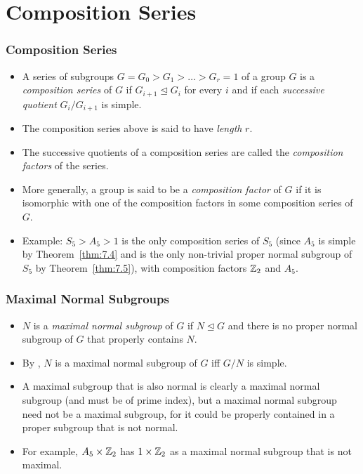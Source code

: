 \documentclass[../Odyssey_Project.tex]{subfiles}
\begin{document}
\setcounter{section}{9}
\section{Composition Series}

\subsubsection*{Composition Series}
\begin{itemize}
  \item A series of subgroups $G = G_0 > G_1 > \ldots > G_r = 1$ of a group $G$ is a \emph{composition series} of $G$ if $G_{i+1} \trianglelefteq G_i$ for every $i$ and if each \emph{successive quotient} $G_i / G_{i+1}$ is simple.
  \item The composition series above is said to have \emph{length} $r$.
  \item The successive quotients of a composition series are called the \emph{composition factors} of the series.
  \item More generally, a group is said to be a \emph{composition factor} of $G$ if it is isomorphic with one of the composition factors in some composition series of $G$.
  \item Example: $S_5 > A_5 > 1$ is the only composition series of $S_5$ (since $A_5$ is simple by Theorem~\ref{thm:7.4} and is the only non-trivial proper normal subgroup of $S_5$ by Theorem~\ref{thm:7.5}), with composition factors $\mathbb{Z}_2$ and $A_5$.
\end{itemize}

\subsubsection*{Maximal Normal Subgroups}
\begin{itemize}
  \item $N$ is a \emph{maximal normal subgroup} of $G$ if $N \trianglelefteq G$ and there is no proper normal subgroup of $G$ that properly contains $N$.
  \item By , $N$ is a maximal normal subgroup of $G$ iff $G/N$ is simple.
  \item A maximal subgroup that is also normal is clearly a maximal normal subgroup (and must be of prime index), but a maximal normal subgroup need not be a maximal subgroup, for it could be properly contained in a proper subgroup that is not normal.
  \item For example, $A_5 \times \mathbb{Z}_2$ has $1 \times \mathbb{Z}_2$ as a maximal normal subgroup that is not maximal.
\end{itemize}
\end{document}
